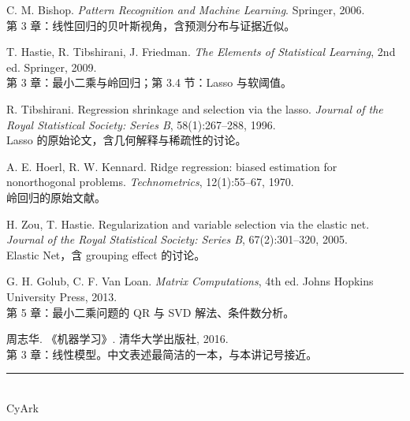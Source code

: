 \documentclass[11pt,a4paper,fontset=windows,zihao=-4]{ctexart}
\begin{document}
\begin{enumerate}[label={[\arabic*]},leftmargin=2.6em,itemsep=0.7em]
  \item C. M. Bishop. \emph{Pattern Recognition and Machine Learning}. Springer, 2006.\\[1pt]
  {\footnotesize\color{steel}第 3 章：线性回归的贝叶斯视角，含预测分布与证据近似。}

  \item T. Hastie, R. Tibshirani, J. Friedman. \emph{The Elements of Statistical Learning}, 2nd ed. Springer, 2009.\\[1pt]
  {\footnotesize\color{steel}第 3 章：最小二乘与岭回归；第 3.4 节：Lasso 与软阈值。}

  \item R. Tibshirani. Regression shrinkage and selection via the lasso. \emph{Journal of the Royal Statistical Society: Series B}, 58(1):267--288, 1996.\\[1pt]
  {\footnotesize\color{steel}Lasso 的原始论文，含几何解释与稀疏性的讨论。}

  \item A. E. Hoerl, R. W. Kennard. Ridge regression: biased estimation for nonorthogonal problems. \emph{Technometrics}, 12(1):55--67, 1970.\\[1pt]
  {\footnotesize\color{steel}岭回归的原始文献。}

  \item H. Zou, T. Hastie. Regularization and variable selection via the elastic net. \emph{Journal of the Royal Statistical Society: Series B}, 67(2):301--320, 2005.\\[1pt]
  {\footnotesize\color{steel}Elastic Net，含 grouping effect 的讨论。}

  \item G. H. Golub, C. F. Van Loan. \emph{Matrix Computations}, 4th ed. Johns Hopkins University Press, 2013.\\[1pt]
  {\footnotesize\color{steel}第 5 章：最小二乘问题的 QR 与 SVD 解法、条件数分析。}

  \item 周志华. 《机器学习》. 清华大学出版社, 2016.\\[1pt]
  {\footnotesize\color{steel}第 3 章：线性模型。中文表述最简洁的一本，与本讲记号接近。}
\end{enumerate}

\vspace{1.0em}
\begin{flushright}
{\color{navy!25}\rule{3.2cm}{0.5pt}}\\[5pt]
{\kaishu\footnotesize\color{steel}CyArk}
\end{flushright}
\end{document}
